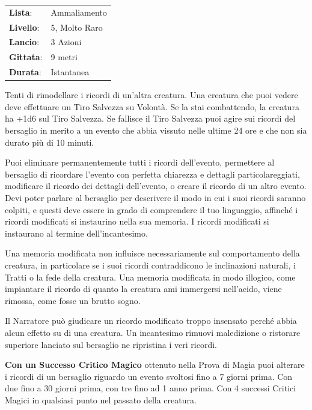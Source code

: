 \begin{multicols}{2}
\noindent\begin{tabularx}{\linewidth}{p{1.3cm}X}
	\rowcolor{gray!20}\textbf{Lista}: & Ammaliamento \\
	\textbf{Livello}: & 5, Molto Raro \\
	\rowcolor{gray!20}\textbf{Lancio}: & 3 Azioni \\
	\textbf{Gittata}: & 9 metri \\
	\rowcolor{gray!20}\textbf{Durata}: & Istantanea \\
\end{tabularx}\smallskip

Tenti di rimodellare i ricordi di un'altra creatura. Una creatura che puoi vedere deve effettuare un Tiro Salvezza su Volontà. Se la stai combattendo, la creatura ha +1d6 sul Tiro Salvezza. Se fallisce il Tiro Salvezza puoi agire sui ricordi del bersaglio in merito a un evento che abbia vissuto nelle ultime 24 ore e che non sia durato più di 10 minuti.

Puoi eliminare permanentemente tutti i ricordi dell'evento, permettere al bersaglio di ricordare l'evento con perfetta chiarezza e dettagli particolareggiati, modificare il ricordo dei dettagli dell'evento, o creare il ricordo di un altro evento. Devi poter parlare al bersaglio per descrivere il modo in cui i suoi ricordi saranno colpiti, e questi deve essere in grado di comprendere il tuo linguaggio, affinché i ricordi modificati si instaurino nella sua memoria.
I ricordi modificati si instaurano al termine dell'incantesimo.

Una memoria modificata non influisce necessariamente sul comportamento della creatura, in particolare se i suoi ricordi contraddicono le inclinazioni naturali, i Tratti o la fede della creatura. Una memoria modificata in modo illogico, come impiantare il ricordo di quanto la creatura ami immergersi nell'acido, viene rimossa, come fosse un brutto sogno.

Il Narratore può giudicare un ricordo modificato troppo insensato perché abbia alcun effetto su di una creatura. Un incantesimo rimuovi maledizione o ristorare superiore lanciato sul bersaglio ne ripristina i veri ricordi.

\textbf{Con un Successo Critico Magico} ottenuto nella Prova di Magia puoi alterare i ricordi di un bersaglio riguardo un evento svoltosi fino a 7 giorni prima. Con due fino a 30 giorni prima, con tre fino ad 1 anno prima. Con 4 successi Critici Magici in qualsiasi punto nel passato della creatura.


\end{multicols}
